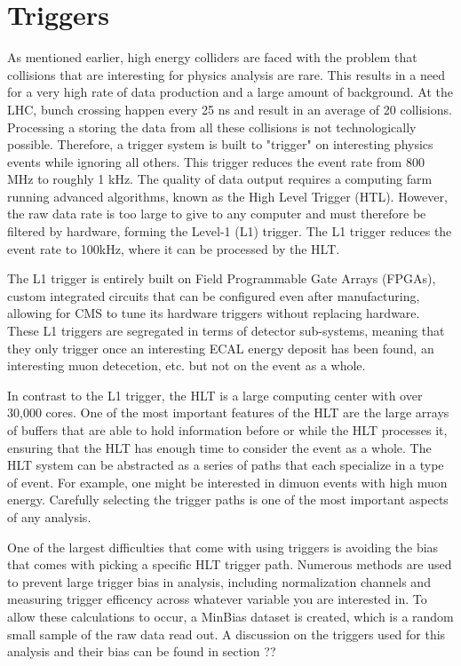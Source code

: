\section{Triggers}

As mentioned earlier, high energy colliders are faced with the problem that collisions that are interesting for physics analysis are rare. This results in a need for a very high rate of data production and a large amount of background. 
At the LHC, bunch crossing happen every 25 ns and result in an average of 20 collisions. Processing a storing the data from all these collisions is not technologically possible. Therefore, a trigger system is built to "trigger" on interesting physics events while ignoring all others. This trigger reduces the event rate from 800 MHz to roughly 1 kHz. The quality of data output requires a computing farm running advanced algorithms, known as the High Level Trigger (HTL). However, the raw data rate is too large to give to any computer and must therefore be filtered by hardware, forming the Level-1 (L1) trigger. The L1 trigger reduces the event rate to 100kHz, where it can be processed by the HLT. %

The L1 trigger is entirely built on Field Programmable Gate Arrays (FPGAs), custom integrated circuits that can be configured even after manufacturing, allowing for CMS to tune its hardware triggers without replacing hardware. These L1 triggers are segregated in terms of detector sub-systems, meaning that they only trigger once an interesting ECAL energy deposit has been found, an interesting muon detecetion, etc. but not on the event as a whole. 

In contrast to the L1 trigger, the HLT is a large computing center with over 30,000 cores. One of the most important features of the HLT are the large arrays of buffers that are able to hold information before or while the HLT processes it, ensuring that the HLT has enough time to consider the event as a whole. The HLT system can be abstracted as a series of paths that each specialize in a type of event. For example, one might be interested in dimuon events with high muon energy. Carefully selecting the trigger paths is one of the most important aspects of any analysis. 

One of the largest difficulties that come with using triggers is avoiding the bias that comes with picking a specific HLT trigger path. Numerous methods are used to prevent large trigger bias in analysis, including normalization channels and measuring trigger efficency across whatever variable you are interested in. To allow these calculations to occur, a MinBias dataset is created, which is a random small sample of the raw data read out. A discussion on the triggers used for this analysis and their bias can be found in section ??%

